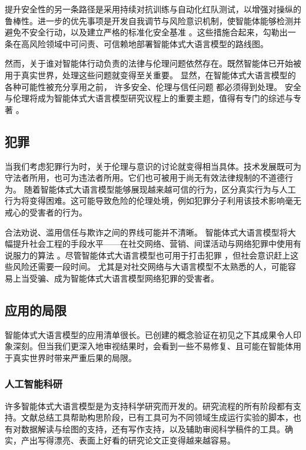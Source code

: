 提升安全性的另一条路径是采用持续对抗训练与自动化红队测试，以增强对操纵的鲁棒性。进一步的优先事项是开发自我调节与风险意识机制，使智能体能够检测并避免不安全行动，以及建立严格的标准化安全基准 \citep{andriushchenko2024agentharm}。这些措施合起来，勾勒出一条在高风险领域中可问责、可信赖地部署智能体式大语言模型的路线图。

然而，关于谁对智能体行动负责的法律与伦理问题依然存在。既然智能体已开始被用于真实世界，处理这些问题就变得至关重要。
显然，在智能体式大语言模型的各种可能性被充分享用之前，
许多安全、伦理与信任问题
都必须得到处理。
安全与伦理将成为智能体式大语言模型研究议程上的重要主题，值得有专门的综述与专著 \citep{gan2024navigating,jiao2025navigating,raza2025responsible}。




\subsection{犯罪}
当我们考虑犯罪行为时，关于伦理与意识的讨论就变得相当具体。技术发展既可为守法者所用，也可为违法者所用。它们也可被用于尚无有效法律规制的不道德行为。
随着智能体式大语言模型能够展现越来越可信的行为，区分真实行为与人工行为将变得困难。这可能导致危险的伦理处境，例如犯罪分子利用该技术影响毫无戒心的受害者的行为。

合法劝说、滥用信任与欺诈之间的界线可能并不清晰。
智能体式大语言模型将大幅提升社会工程的手段水平——在社交网络、营销、间谍活动与网络犯罪中使用有说服力的算法 \citep{kshetri2025transforming,lupinacci2025dark}。尽管智能体式大语言模型也可用于打击犯罪 \citep{challita2025redteamllm,andriushchenko2024agentharm}，但社会意识赶上这些风险还需要一段时间。%
尤其是对社交网络与大语言模型不太熟悉的人，可能容易上当受骗、成为智能体式大语言模型网络犯罪的受害者。
\subsection{应用的局限}
智能体式大语言模型的应用清单很长。已创建的概念验证在初见之下其成果令人印象深刻。但当我们更深入地审视结果时，会看到一些不易修复、且可能在智能体用于真实世界时带来严重后果的局限。

\subsubsection{人工智能科研}
许多智能体式大语言模型是为支持科学研究而开发的。研究流程的所有阶段都有支持。文献总结工具帮助构思阶段，已有工具可为不同领域生成运行实验的脚本，也有对数据解读与绘图的支持，还有写作支持，以及辅助审阅科学稿件的工具。确实，产出写得漂亮、表面上好看的研究论文正变得越来越容易。

